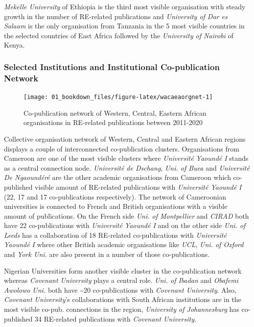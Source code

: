 \documentclass[
]{book}
\begin{document}
\emph{Mekelle University} of Ethiopia is the third most visible organisation with steady growth in the number of RE-related publications and \emph{University of Dar es Salaam} is the only organisation from Tanzania in the 5 most visible countries in the selected countries of East Africa followed by the \emph{University of Nairobi} of Kenya.

\hypertarget{selected-institutions-and-institutional-co-publication-network}{%
\subsubsection{Selected Institutions and Institutional Co-publication Network}\label{selected-institutions-and-institutional-co-publication-network}}

\begin{figure}
\texttt{[image: 01\_bookdown\_files/figure-latex/wacaeaorgnet-1]} \caption{Co-publication network of Western, Central, Eastern African organisations in RE-related publications between 2011-2020}\label{fig:wacaeaorgnet}
\end{figure}

Collective organisation network of Western, Central and Eastern African regions displays a couple of interconnected co-publication clusters. Organisations from Cameroon are one of the most visible clusters where \emph{Université Yaoundé I} stands as a central connection node. \emph{Université de Dschang}, \emph{Uni. of Buea} and \emph{Université De Ngaoundéré} are the other academic organisations from Cameroon which co-published visible amount of RE-related publications with \emph{Université Yaoundé I} (22, 17 and 17 co-publications respectively). The network of Cameroonian universities is connected to French and British organisations with a visible amount of publications. On the French side \emph{Uni. of Montpellier} and \emph{CIRAD} both have 22 co-publications with \emph{Université Yaoundé I} and on the other side \emph{Uni. of Leeds} has a collaboration of 18 RE-related co-publications with \emph{Université Yaoundé I} where other British academic organisations like \emph{UCL}, \emph{Uni. of Oxford} and \emph{York Uni.} are also present in a number of those co-publications.

Nigerian Universities form another visible cluster in the co-publication network whereas \emph{Covenant University} plays a central role. \emph{Uni. of Ibadan} and \emph{Obafemi Awolowo Uni.} both have \textasciitilde20 co-publications with \emph{Covenant University}. Also, \emph{Covenant University}'s collaborations with South African institutions are in the most visible co-pub. connections in the region, \emph{University of Johannesburg} has co-published 34 RE-related publications with \emph{Covenant University}.
\end{document}

